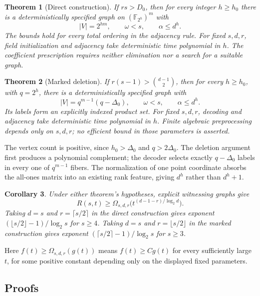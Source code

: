 \documentclass[11pt,a4paper]{article}
\newcommand{\F}{\mathbb F}
\newtheorem{theorem}{Theorem}[section]
\newtheorem{corollary}[theorem]{Corollary}
\theoremstyle{definition}
\theoremstyle{remark}
\numberwithin{equation}{section}
\begin{document}
\begin{theorem}[Direct construction]\label{thm:direct}
If $rs>D_0$, then for every integer $h\ge h_0$ there is a deterministically specified graph on $(\F_{2^h})^m$ with
\[
|V|=2^{hm},\qquad \omega<s,\qquad \alpha\le d^h.
\]
The bounds hold for every total ordering in the adjacency rule. For fixed $s,d,r$, field initialization and adjacency take deterministic time polynomial in $h$. The coefficient prescription requires neither elimination nor a search for a suitable graph.
\end{theorem}

\begin{theorem}[Marked deletion]\label{thm:marked}
If $r(s-1)>\binom{d-1}2$, then for every $h\ge h_0$, with $q=2^h$, there is a deterministically specified graph with
\[
|V|=q^{m-1}(q-\Delta_0),\qquad \omega<s,\qquad \alpha\le d^h.
\]
Its labels form an explicitly indexed product set. For fixed $s,d,r$, decoding and adjacency take deterministic time polynomial in $h$. Finite algebraic preprocessing depends only on $s,d,r$; no efficient bound in those parameters is asserted.
\end{theorem}

The vertex count is positive, since $h_0>\Delta_0$ and $q>2\Delta_0$. The deletion argument first produces a polynomial complement; the decoder selects exactly $q-\Delta_0$ labels in every one of $q^{m-1}$ fibers. The normalization of one point coordinate absorbs the all-ones matrix into an existing rank feature, giving $d^h$ rather than $d^h+1$.

\begin{corollary}\label{cor:original-ramsey}
Under either theorem's hypotheses, explicit witnessing graphs give
\[
R(s,t)\ge\Omega_{s,d,r}\bigl(t^{(d-1-r)/\log_2 d}\bigr).
\]
Taking $d=s$ and $r=\lceil s/2\rceil$ in the direct construction gives exponent $(\lfloor s/2\rfloor-1)/\log_2 s$ for $s\ge4$. Taking $d=s$ and $r=\lfloor s/2\rfloor$ in the marked construction gives exponent $(\lceil s/2\rceil-1)/\log_2 s$ for $s\ge3$.
\end{corollary}

Here $f(t)\ge\Omega_{s,d,r}(g(t))$ means $f(t)\ge Cg(t)$ for every sufficiently large $t$, for some positive constant depending only on the displayed fixed parameters.

\subsection{Proofs}\label{sec:strict}
\end{document}
